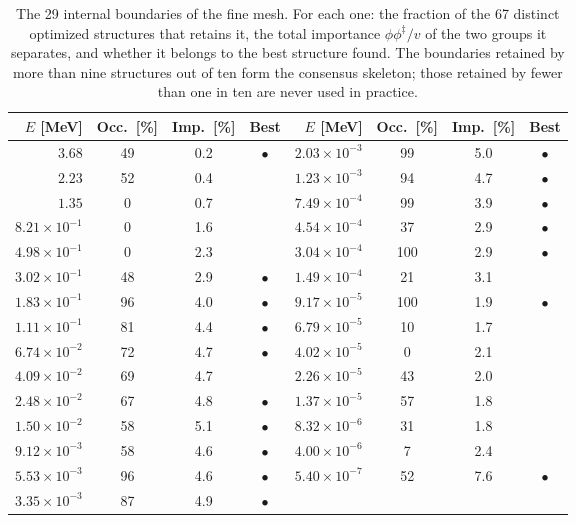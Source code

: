 \begin{table}[htbp]
\centering
\caption{The 29 internal boundaries of the fine mesh. For each one: the fraction
of the 67 distinct optimized structures that retains it, the total importance
$\phi\phi^{\ddagger}/v$ of the two groups it separates, and whether it belongs to
the best structure found. The boundaries retained by more than nine structures
out of ten form the consensus skeleton; those retained by fewer than one in ten
are never used in practice.}
\label{tab:boundaries}
\begin{tabular}{rccc|rccc}
\hline
$E$ [MeV] & Occ.\ [\%] & Imp.\ [\%] & Best &
$E$ [MeV] & Occ.\ [\%] & Imp.\ [\%] & Best \\ \hline
    $3.68$ & 49 & 0.2 & $\bullet$ & $2.03\times10^{-3}$ & 99 & 5.0 & $\bullet$ \\
    $2.23$ & 52 & 0.4 &  & $1.23\times10^{-3}$ & 94 & 4.7 & $\bullet$ \\
    $1.35$ & 0 & 0.7 &  & $7.49\times10^{-4}$ & 99 & 3.9 & $\bullet$ \\
    $8.21\times10^{-1}$ & 0 & 1.6 &  & $4.54\times10^{-4}$ & 37 & 2.9 & $\bullet$ \\
    $4.98\times10^{-1}$ & 0 & 2.3 &  & $3.04\times10^{-4}$ & 100 & 2.9 & $\bullet$ \\
    $3.02\times10^{-1}$ & 48 & 2.9 & $\bullet$ & $1.49\times10^{-4}$ & 21 & 3.1 &  \\
    $1.83\times10^{-1}$ & 96 & 4.0 & $\bullet$ & $9.17\times10^{-5}$ & 100 & 1.9 & $\bullet$ \\
    $1.11\times10^{-1}$ & 81 & 4.4 & $\bullet$ & $6.79\times10^{-5}$ & 10 & 1.7 &  \\
    $6.74\times10^{-2}$ & 72 & 4.7 & $\bullet$ & $4.02\times10^{-5}$ & 0 & 2.1 &  \\
    $4.09\times10^{-2}$ & 69 & 4.7 &  & $2.26\times10^{-5}$ & 43 & 2.0 &  \\
    $2.48\times10^{-2}$ & 67 & 4.8 & $\bullet$ & $1.37\times10^{-5}$ & 57 & 1.8 &  \\
    $1.50\times10^{-2}$ & 58 & 5.1 & $\bullet$ & $8.32\times10^{-6}$ & 31 & 1.8 &  \\
    $9.12\times10^{-3}$ & 58 & 4.6 & $\bullet$ & $4.00\times10^{-6}$ & 7 & 2.4 &  \\
    $5.53\times10^{-3}$ & 96 & 4.6 & $\bullet$ & $5.40\times10^{-7}$ & 52 & 7.6 & $\bullet$ \\
    $3.35\times10^{-3}$ & 87 & 4.9 & $\bullet$ &  & & &  \\
\hline
\end{tabular}
\end{table}
